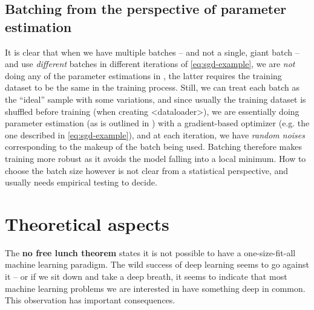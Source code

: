 \documentclass[hyperref, a4paper, 12pt]{report}
\newcommand*{\concept}[1]{{\textbf{#1}}}
\def\texttt#1{<#1>}%
\newcommand{\shortcode}[1]{\texttt{#1}}
\begin{document}
\subsection{Batching from the perspective of parameter estimation}
It is clear that when we have multiple batches -- and not a single, giant batch -- and use \emph{different} batches in different iterations of \eqref{eq:sgd-example},
we are \emph{not} doing any of the parameter estimations in ,
the latter requires the training dataset to be the same in the training process.
Still, we can treat each batch as the ``ideal'' sample with some variations,
and since usually the training dataset is shuffled before training (when creating \shortcode{dataloader}),
we are essentially doing parameter estimation (as is outlined in )
with a gradient-based optimizer (e.g. the one described in \eqref{eq:sgd-example}),
and at each iteration, we have \emph{random noises} corresponding to the makeup of the batch being used.
Batching therefore makes training more robust as it avoids the model falling into a local minimum.
How to choose the batch size however is not clear from a statistical perspective, and usually needs empirical testing to decide.

\section{Theoretical aspects}\label{sec:theoretical-aspects}

The \concept{no free lunch theorem} states it is not possible to have a one-size-fit-all machine learning paradigm.
The wild success of deep learning seems to go against it -- or if we sit down and take a deep breath, it seems to indicate that most machine learning problems we are interested in have something deep in common.
This observation has important consequences.
\end{document}
